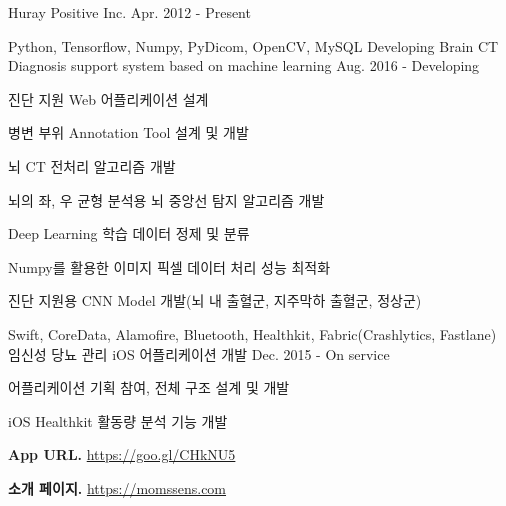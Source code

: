 \begin{cvskills}
  \cvskill
    {Huray Positive Inc.} 
    {Apr. 2012 - Present} 
\end{cvskills}

\begin{cvexpentries}
  \cvexpentry
    {Python, Tensorflow, Numpy, PyDicom, OpenCV, MySQL}
    {Developing Brain CT Diagnosis support system based on machine learning}
    {Aug. 2016 - Developing}
    {}
    {
        \begin{cvitems}
            \item {진단 지원 Web 어플리케이션 설계}
            \item {병변 부위 Annotation Tool 설계 및 개발}
            \item {뇌 CT 전처리 알고리즘 개발}
            \item {뇌의 좌, 우 균형 분석용 뇌 중앙선 탐지 알고리즘 개발}
            \item {Deep Learning 학습 데이터 정제 및 분류}
            \item {Numpy를 활용한 이미지 픽셀 데이터 처리 성능 최적화}
            \item {진단 지원용 CNN Model 개발(뇌 내 출혈군, 지주막하 출혈군, 정상군)}
        \end{cvitems}
    }
\end{cvexpentries}

\begin{cvexpentries}
  \cvexpentry
    {Swift, CoreData, Alamofire, Bluetooth, Healthkit, Fabric(Crashlytics, Fastlane)}
    {임신성 당뇨 관리 iOS 어플리케이션 개발}
    {Dec. 2015 - On service}
    {}
    {
        \begin{cvitems}
            \item {어플리케이션 기획 참여, 전체 구조 설계 및 개발}
            \item {iOS Healthkit 활동량 분석 기능 개발}
            \item {\textbf{App URL.} \href{https://goo.gl/CHkNU5}{https://goo.gl/CHkNU5}}
            \item {\textbf{소개 페이지.} \href{https://momssens.com}{https://momssens.com}}
        \end{cvitems}
    }
\end{cvexpentries}

